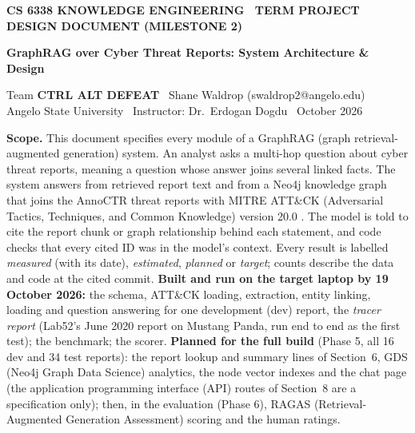 \documentclass[10pt]{article}
\begin{document}
\thispagestyle{first}
{\sffamily
{\color{accent}\footnotesize\bfseries CS 6338 KNOWLEDGE ENGINEERING \textbullet\ TERM PROJECT DESIGN DOCUMENT (MILESTONE 2)}\par\vspace{2pt}
{\color{ink}\LARGE\bfseries GraphRAG over Cyber Threat Reports: System Architecture \& Design}\par\vspace{3pt}
{\small Team \textbf{CTRL ALT DEFEAT} \textbullet\ Shane Waldrop (swaldrop2@angelo.edu)\\ Angelo State University \textbullet\ Instructor: Dr.\ Erdogan Dogdu \textbullet\ October 2026}\par}
\vspace{4pt}
\noindent\colorbox{shade}{\parbox{\dimexpr\textwidth-2\fboxsep}{\small
\textbf{Scope.} This document specifies every module of a GraphRAG (graph retrieval-augmented generation) system. An analyst asks a multi-hop question about cyber threat reports, meaning a question whose answer joins several linked facts. The system answers from retrieved report text and from a Neo4j knowledge graph that joins the AnnoCTR threat reports \cite{1} with MITRE ATT\&CK (Adversarial Tactics, Techniques, and Common Knowledge) version 20.0 \cite{11}. The model is told to cite the report chunk or graph relationship behind each statement, and code checks that every cited ID was in the model's context. Every result is labelled \emph{measured} (with its date), \emph{estimated}, \emph{planned} or \emph{target}; counts describe the data and code at the cited commit.
\textbf{Built and run on the target laptop by 19 October 2026:} the schema, ATT\&CK loading, extraction, entity linking, loading and question answering for one development (dev) report, the \emph{tracer report} (Lab52's June 2020 report on Mustang Panda, run end to end as the first test); the benchmark; the scorer. \textbf{Planned for the full build} (Phase 5, all 16 dev and 34 test reports): the report lookup and summary lines of Section~6, GDS (Neo4j Graph Data Science) analytics, the node vector indexes and the chat page (the application programming interface (API) routes of Section~8 are a specification only); then, in the evaluation (Phase 6), RAGAS (Retrieval-Augmented Generation Assessment) scoring and the human ratings.}}
\end{document}
